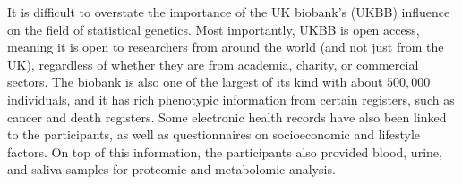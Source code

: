 It is difficult to overstate the importance of the UK biobank's (UKBB) influence on the field of statistical genetics. Most importantly, UKBB is open access, meaning it is open to researchers from around the world (and not just from the UK), regardless of whether they are from academia, charity, or commercial sectors\cite{bycroft2018uk,biobank2015genotyping}. The biobank is also one of the largest of its kind with about $ 500,000 $ individuals, and it has rich phenotypic information from certain registers, such as cancer and death registers. Some electronic health records have also been linked to the participants, as well as questionnaires on socioeconomic and lifestyle  factors. On top of this information, the participants also provided blood, urine, and saliva samples for proteomic and metabolomic analysis.


